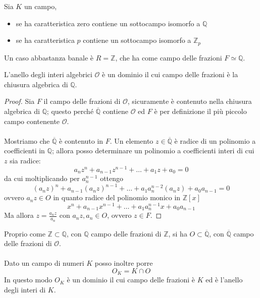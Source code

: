 \begin{proposizione}
	Sia $K$ un campo, 
	\begin{itemize}
		\item se ha caratteristica zero contiene un sottocampo isomorfo a $\mathbb{Q}$
		\item se ha caratteristica $p$ contiene un sottocampo isomorfo a $\mathbb{Z}_p$
	\end{itemize}
\end{proposizione}
\begin{esempio}
	Un caso abbastanza banale è $R=\mathbb{Z}$, che ha come campo delle frazioni $F\simeq\mathbb{Q}$.
\end{esempio}
\begin{teorema}
	L'anello degli interi algebrici $\mathcal{O}$ è un dominio il cui campo delle frazioni è la chiusura algebrica di $\mathbb{Q}$.
\end{teorema}
\begin{proof}
	Sia $F$ il campo delle frazioni di $\mathcal{O}$, sicuramente è contenuto nella chiusura algebrica di $\mathbb{Q}$; questo perché $\overline{\mathbb{Q}}$ contiene $\mathcal{O}$ ed $F$ è per definizione il più piccolo campo contenente $\mathcal{O}$. \\ \\ Mostriamo che $\overline{\mathbb{Q}}$ è contenuto in $F$. Un elemento $z\in\overline{\mathbb{Q}}$ è radice di un polinomio a coefficienti in $\mathbb{Q}$; allora posso determinare un polinomio a coefficienti interi di cui $z$ sia radice:
	\begin{equation*}
	a_nz^n+a_{n-1}z^{n-1}+\dots+a_1z+a_0=0
	\end{equation*}
	da cui moltiplicando per $a_n^{n-1}$ ottengo
	\begin{equation*}
	(a_nz)^n+a_{n-1}(a_nz)^{n-1}+\dots+a_1a_n^{n-2}(a_nz)+a_0a_{n-1}=0
	\end{equation*}
	ovvero $a_nz\in O$ in quanto radice del polinomio monico in $\mathbb{Z}[x]$
	\begin{equation*}
	x^n+a_{n-1}x^{n-1}+\dots+a_1a_n^{n-1}x+a_0a_{n-1}
	\end{equation*}
	Ma allora $z=\frac{a_nz}{a_n}$ con $a_nz,a_n\in O$, ovvero $z\in F$.
\end{proof}
\begin{osservazione}
	Proprio come $\mathbb{Z}\subset\mathbb{Q}$, con $\mathbb{Q}$ campo delle frazioni di $\mathbb{Z}$, si ha $O\subset\overline{\mathbb{Q}}$, con $\overline{\mathbb{Q}}$ campo delle frazioni di $\mathcal{O}$. \\ \\ Dato un campo di numeri $K$ posso inoltre porre 
	\begin{equation*}
	O_K=K\cap O
	\end{equation*}
	In questo modo $O_K$ è un dominio il cui campo delle frazioni è $K$ ed è l'anello degli interi di $K$.
\end{osservazione}
